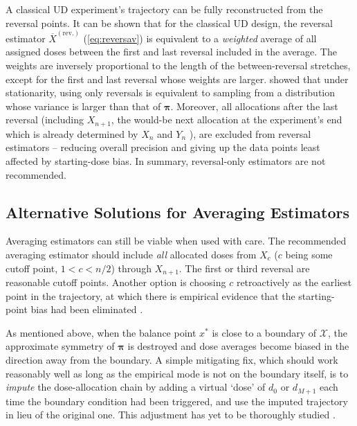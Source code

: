 A classical UD experiment's trajectory can be fully reconstructed from the reversal points. It can be shown that for the classical UD design, the reversal estimator $\overline{X}^\mathrm{(rev.)}$ (\ref{eq:reversav}) is equivalent to a \emph{weighted} average of all assigned doses between the first and last reversal included in the average. The weights are inversely proportional to the length of the between-reversal stretches, except for the first and last reversal whose weights are larger. \cite{Oron07} showed that under stationarity, using only reversals is equivalent to sampling from a distribution whose variance is larger than that of $\boldsymbol{\pi}$. Moreover, all allocations after the last reversal (including $X_{n+1}$, the would-be next allocation at the experiment's end which is already determined by $X_n$ and $Y_n$ \citep{BrownleeEtAl53}), are excluded from reversal estimators -- reducing overall precision and giving up the data points least affected by starting-dose bias. In summary, reversal-only estimators are not recommended.

\subsection{Alternative Solutions for Averaging Estimators}

Averaging estimators can still be viable when used with care. The recommended averaging estimator should include \emph{all} allocated doses from $X_c$ ($c$ being some cutoff point, $1<c<n/2$) through $X_{n+1}$. The first or third reversal are reasonable cutoff points. Another option is choosing $c$ retroactively as the earliest point in the trajectory, at which there is empirical evidence that the starting-point bias had been eliminated \citep[Section~3.3]{Oron07}.

As mentioned above, when the balance point $x^*$ is close to a boundary of $\mathcal{X}$, the approximate symmetry of $\boldsymbol{\pi}$ is destroyed and dose averages become biased in the direction away from the boundary. A simple mitigating fix, which should work reasonably well as long as the empirical mode is not on the boundary itself, is to \emph{impute} the dose-allocation chain by adding a virtual `dose' of $d_0$ or $d_{M+1}$ each time the boundary condition had been triggered, and use the imputed trajectory in lieu of the original one. This adjustment has yet to be thoroughly studied \citep[Section~3.3]{Oron07}.

